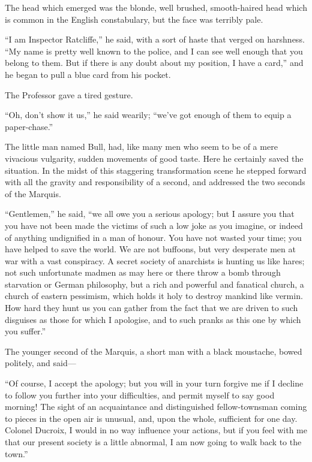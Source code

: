 The head which emerged was the blonde, well brushed, smooth-haired head which is common in the English constabulary, but the face was terribly pale.

“I am Inspector Ratcliffe,” he said, with a sort of haste that verged on harshness. “My name is pretty well known to the police, and I can see well enough that you belong to them. But if there is any doubt about my position, I have a card,” and he began to pull a blue card from his pocket.

The Professor gave a tired gesture.

“Oh, don’t show it us,” he said wearily; “we’ve got enough of them to equip a paper-chase.”

The little man named Bull, had, like many men who seem to be of a mere vivacious vulgarity, sudden movements of good taste. Here he certainly saved the situation. In the midst of this staggering transformation scene he stepped forward with all the gravity and responsibility of a second, and addressed the two seconds of the Marquis.

“Gentlemen,” he said, “we all owe you a serious apology; but I assure you that you have not been made the victims of such a low joke as you imagine, or indeed of anything undignified in a man of honour. You have not wasted your time; you have helped to save the world. We are not buffoons, but very desperate men at war with a vast conspiracy. A secret society of anarchists is hunting us like hares; not such unfortunate madmen as may here or there throw a bomb through starvation or German philosophy, but a rich and powerful and fanatical church, a church of eastern pessimism, which holds it holy to destroy mankind like vermin. How hard they hunt us you can gather from the fact that we are driven to such disguises as those for which I apologise, and to such pranks as this one by which you suffer.”

The younger second of the Marquis, a short man with a black moustache, bowed politely, and said⁠—

“Of course, I accept the apology; but you will in your turn forgive me if I decline to follow you further into your difficulties, and permit myself to say good morning! The sight of an acquaintance and distinguished fellow-townsman coming to pieces in the open air is unusual, and, upon the whole, sufficient for one day. Colonel Ducroix, I would in no way influence your actions, but if you feel with me that our present society is a little abnormal, I am now going to walk back to the town.”

